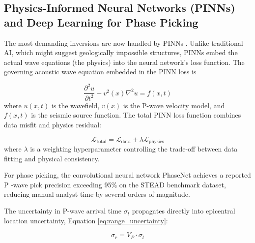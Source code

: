\documentclass[data,article,accept,pdftex,moreauthors]{Definitions/mdpi}
\begin{document}
\subsection{Physics-Informed Neural Networks (PINNs) and Deep Learning for Phase Picking}

The most demanding inversions are now handled by PINNs \cite{song2022versatile}. Unlike traditional AI, which might suggest geologically impossible structures, PINNs embed the actual wave equations (the physics) into the neural network's loss function. The governing acoustic wave equation embedded in the PINN loss is

\begin{equation}
\frac{\partial^2 u}{\partial t^2} - v^2(x%
)\nabla^2 u = f(x, t)
\end{equation}
where $u(x,t)$ is the wavefield, $v(x)$ is the P-wave velocity model, and $f(x,t)$ is the seismic source function. The total PINN loss function combines data misfit and physics residual:

\begin{equation}
\mathcal{L}_{\text{total}} = \mathcal{L}_{\text{data}} + \lambda \mathcal{L}_{\text{physics}}
\end{equation}
where $\lambda$ is a weighting hyperparameter controlling the trade-off between data fitting and physical consistency.

For phase picking, the convolutional neural network PhaseNet %
 achieves a reported P%
-wave pick precision exceeding 95\% on the STEAD benchmark dataset, reducing manual analyst time by several orders of magnitude.

The uncertainty in P-wave arrival time $\sigma_t$ propagates directly into epicentral location uncertainty, Equation \eqref{eq:range_uncertainty}:

\begin{equation}
\label{eq:range_uncertainty}
\sigma_r = V_P \cdot \sigma_t
\end{equation}
\end{document}
